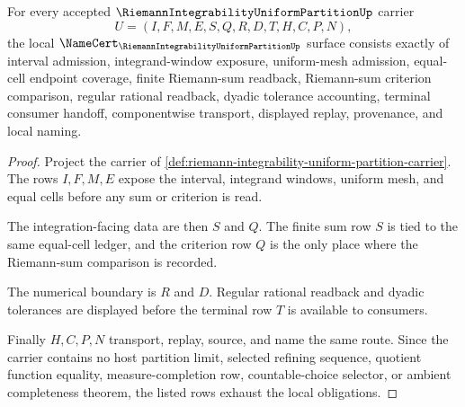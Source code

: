 \begin{theorem}
\label{thm:riemann-integrability-uniform-partition-obligations}
For every accepted $\RiemannIntegrabilityUniformPartitionUp$ carrier
$$
U=(I,F,M,E,S,Q,R,D,T,H,C,P,N),
$$
the local $\NameCert_{\RiemannIntegrabilityUniformPartitionUp}$ surface consists exactly of interval admission, integrand-window exposure, uniform-mesh admission, equal-cell endpoint coverage, finite Riemann-sum readback, Riemann-sum criterion comparison, regular rational readback, dyadic tolerance accounting, terminal consumer handoff, componentwise transport, displayed replay, provenance, and local naming.
\end{theorem}
\begin{proof}
Project the carrier of \autoref{def:riemann-integrability-uniform-partition-carrier}. The rows $I,F,M,E$ expose the interval, integrand windows, uniform mesh, and equal cells before any sum or criterion is read.

The integration-facing data are then $S$ and $Q$. The finite sum row $S$ is tied to the same equal-cell ledger, and the criterion row $Q$ is the only place where the Riemann-sum comparison is recorded.

The numerical boundary is $R$ and $D$. Regular rational readback and dyadic tolerances are displayed before the terminal row $T$ is available to consumers.

Finally $H,C,P,N$ transport, replay, source, and name the same route. Since the carrier contains no host partition limit, selected refining sequence, quotient function equality, measure-completion row, countable-choice selector, or ambient completeness theorem, the listed rows exhaust the local obligations.
\end{proof}

